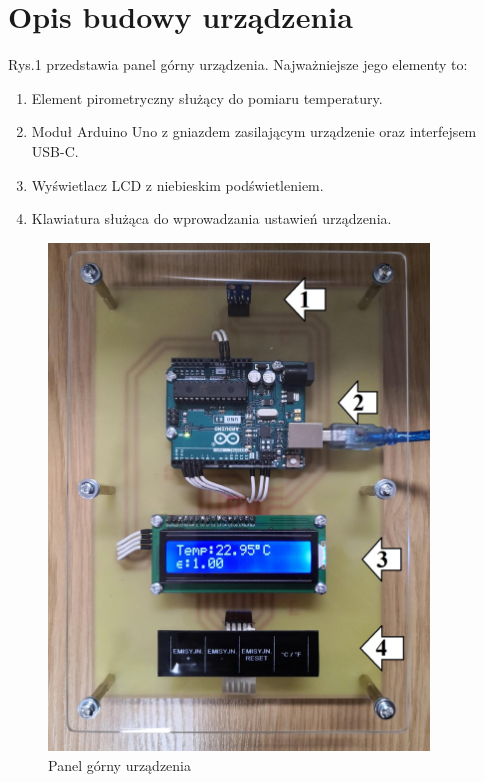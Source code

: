 \section{Opis budowy urządzenia}

Rys.1 przedstawia panel górny urządzenia. Najważniejsze jego elementy to:

\begin{enumerate}
    
    \item Element pirometryczny służący do pomiaru temperatury.
    
    \item Moduł Arduino Uno z gniazdem zasilającym urządzenie oraz interfejsem USB-C.
    
    \item Wyświetlacz LCD z niebieskim podświetleniem.
    
    \item Klawiatura służąca do wprowadzania ustawień urządzenia.

\end{enumerate}

\begin{figure}[h!]
    \centering
    \includegraphics[width=0.9\textwidth]{images/front_opis.jpg}
    \caption{Panel górny urządzenia}
    \label{fig:panel_gorny}
\end{figure}

